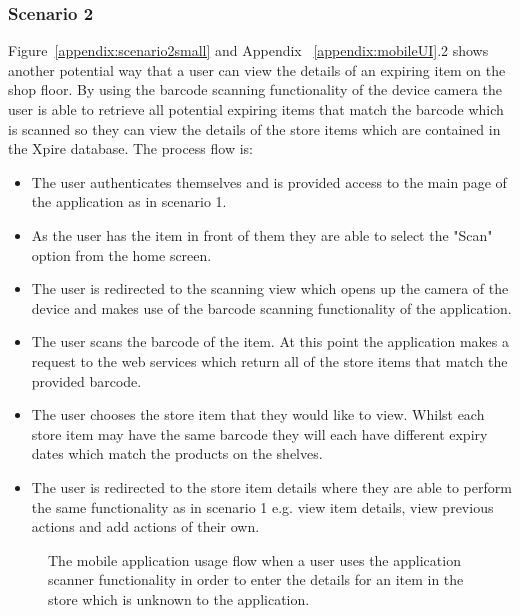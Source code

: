 \documentclass[a4paper,11pt]{report}
\begin{document}
\subsubsection{Scenario 2}
Figure~\ref{appendix:scenario2small} and Appendix ~\ref{appendix:mobileUI}.2 shows another potential way that a user can view the details of an expiring item on the shop floor. By using the barcode scanning functionality of the device camera the user is able to retrieve all potential expiring items that match the barcode which is scanned so they can view the details of the store items which are contained in the Xpire database. The process flow is:
\begin{itemize}
    \item The user authenticates themselves and is provided access to the main page of the application as in scenario 1. 
    \item As the user has the item in front of them they are able to select the "Scan" option from the home screen.
    \item The user is redirected to the scanning view which opens up the camera of the device and makes use of the barcode scanning functionality of the application.
    \item The user scans the barcode of the item. At this point the application makes a request to the web services which return all of the store items that match the provided barcode. 
    \item The user chooses the store item that they would like to view. Whilst each store item may have the same barcode they will each have different expiry dates which match the products on the shelves. 
    \item The user is redirected to the store item details where they are able to perform the same functionality as in scenario 1 e.g. view item details, view previous actions and add actions of their own.
\end{itemize}

\begin{figure}[H]
    \centering
    \caption{The mobile application usage flow when a user uses the application scanner functionality in order to enter the details for an item in the store which is unknown to the application.}
    \label{appendix:scenario3small}
\end{figure}
\end{document}
